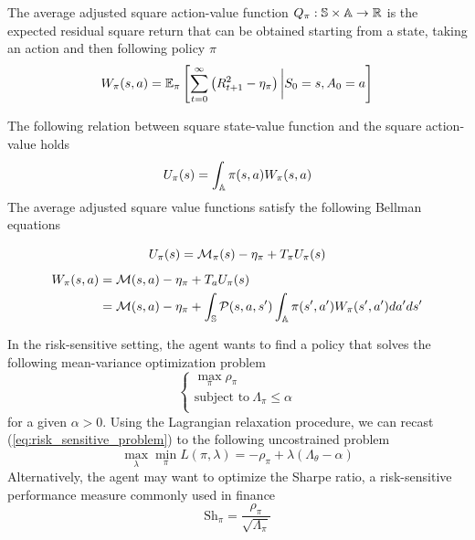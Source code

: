 \begin{definition}
	The average adjusted square action-value function $Q_\pi : \S \times \A \to 
	\R$ is the expected residual square return that can be obtained starting from a
	state, taking an action and then following policy $\pi$
	\begin{equation}
		W_\pi(s, a) = \E[\pi]{\sum^{\infty}_{t=0} \left(R_{t+1}^2 -
			\eta_\pi\right) \bigg| S_0 = s, A_0 = a}
	\end{equation}
\end{definition}
The following relation between square state-value function and the square action-value holds
\begin{equation}\label{eq:UW_equality}
	U_\pi(s) = \int_\A \pi(s,a) W_\pi(s,a)
\end{equation}
The average adjusted square value functions satisfy the following Bellman equations
\begin{proposition}
	\begin{equation}
		U_\pi(s) = \calM_\pi(s) - \eta_\pi + T_\pi U_\pi(s)
	\end{equation}
	\begin{equation}
		\begin{split}
			W_\pi(s,a) &= \calM(s,a) - \eta_\pi + T_a U_\pi(s)\\
			&= \calM(s,a) - \eta_\pi + \int_{\S} \calP(s,a,s') \int_{\A} \pi(s',a') W_\pi(s',a') da' ds'
		\end{split}
	\end{equation}
\end{proposition}
In the risk-sensitive setting, the agent wants to find a policy that solves the 
following mean-variance optimization problem
\begin{equation}\label{eq:risk_sensitive_problem}
	\begin{cases}
		\max_\pi \rho_\pi\\
		\text{subject to}\ \Lambda_\pi \leq \alpha\\
	\end{cases}
\end{equation}
for a given $\alpha > 0$. Using the Lagrangian relaxation procedure, we can 
recast (\ref{eq:risk_sensitive_problem}) to the following uncostrained problem
\begin{equation}
	\max_\lambda \min_\pi L(\pi, \lambda) = - \rho_\pi + \lambda 
	(\Lambda_\theta - \alpha)
\end{equation}
Alternatively, the agent may want to optimize the Sharpe ratio, a risk-sensitive performance measure commonly used in finance
\begin{equation}
	\text{Sh}_\pi = \frac{\rho_\pi}{\sqrt{\Lambda_\pi}} 
\end{equation}



